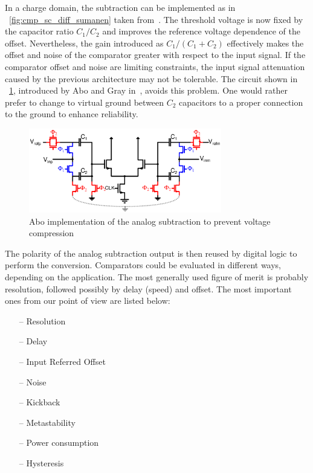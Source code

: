 In a charge domain, the subtraction can be implemented as in \figurename~\ref{fig:cmp_sc_diff_sumanen} taken from~\cite{Sumanen2002}. The threshold voltage is now fixed by the capacitor ratio \(C_1/C_2 \) and improves the reference voltage dependence of the offset. Nevertheless, the gain introduced as \(C_1/(C_1+C_2) \) effectively makes the offset and noise of the comparator greater with respect to the input signal. If the comparator offset and noise are limiting constraints, the input signal attenuation caused by the previous architecture may not be tolerable. The circuit shown in \figurename~\ref{fig:abo_sc}, introduced by Abo and Gray in~\cite{Abo1999}, avoids this problem. One would rather prefer to change to virtual ground between \(C_2\) capacitors to a proper connection to the ground to enhance reliability.

\begin{figure}[htp]
	\centering
    \includegraphics[width=0.75\textwidth]{Chapter7/Figs/abo_sc.ps}
	\caption{Abo implementation of the analog subtraction to prevent voltage compression}
	\label{fig:abo_sc}
\end{figure}

The polarity of the analog subtraction output is then reused by digital logic to perform the conversion. Comparators could be evaluated in different ways, depending on the application. The most generally used figure of merit is probably resolution, followed possibly by delay (speed) and offset. The most important ones from our point of view are listed below:
\begin{multicols}{2}
    \begin{itemize}
        \itemsep-0.5em
        \item[--] Resolution
        \item[--] Delay
        \item[--] Input Referred Offset
        \item[--] Noise
        \item[--] Kickback
        \item[--] Metastability
        \item[--] Power consumption
        \item[--] Hysteresis
    \end{itemize}
\end{multicols}

